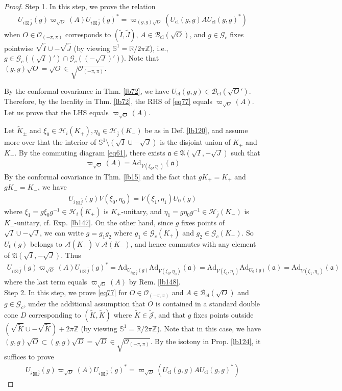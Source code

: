 \documentclass[11pt,b5paper,notitlepage]{article}
\theoremstyle{definition}
\theoremstyle{plain}
\newcommand{\fk}{\mathfrak}
\newcommand{\wtd}{\widetilde}
\newcommand{\ovl}{\overline}
\newcommand{\Jtd}{\widetilde{\mathcal J}}
\newcommand{\Ad}{\mathrm{Ad}}
\newcommand{\Zbb}{\mathbb Z}
\newcommand{\Rbb}{\mathbb R}
\newcommand{\Sbb}{{\mathbb S}}
\newcommand{\Gc}{\mathscr G_c}
\newcommand{\MA}{\mathcal A}
\newcommand{\MH}{\mathcal H}
\newcommand{\Bcl}{\mathcal B_{\mathrm{cl}}}
\newcommand{\Opp}{\mathcal O_{(-\pi,\pi)}}
\newcommand{\ZOpp}{\sqrt{\mathcal O_{(-\pi,\pi)}}}
\newcommand{\Ucl}{U_{\mathrm{cl}}}
\numberwithin{equation}{section}
\begin{document}
\begin{proof}
Step 1. In this step, we prove the relation
\begin{align*}
U_{i\boxtimes\ovl j}(g)\varpi_{\sqrt O}(A)U_{i\boxtimes\ovl j}(g)^*=\varpi_{(g,g)\sqrt O}(\Ucl(g,g)A\Ucl(g,g)^*)  \tag{a}\label{eq77}
\end{align*}
when $O\in\Opp$ corresponds to $(\wtd I,\wtd J)$, $A\in\Bcl(\sqrt O)$, and $g\in\Gc$ fixes pointwise $\sqrt {\wtd I}\cup -\sqrt {\wtd J}$ (by viewing $\Sbb^1=\Rbb/2\pi\Zbb$), i.e., $g\in\Gc((\sqrt I)')\cap\Gc((-\sqrt J)')$). Note that $(g,g)\sqrt O=\sqrt O\in\ZOpp$.


By the conformal covariance in Thm. \ref{lb72}, we have $\Ucl(g,g)\in\Bcl(\sqrt O')$. Therefore, by the locality in Thm. \ref{lb72}, the RHS of \eqref{eq77} equals $\varpi_{\sqrt O}(A)$. Let us prove that the LHS equals $\varpi_{\sqrt O}(A)$. 


Let $\wtd K_\pm$ and $\xi_0\in\MH_i(K_+),\eta_0\in\MH_{\ovl j}(K_-)$ be as in Def. \ref{lb120}, and assume more over that the interior of $\Sbb^1\setminus(\sqrt I\cup-\sqrt J)$ is the disjoint union of $K_+$ and $K_-$. By the commuting diagram \eqref{eq61}, there exists $\fk a\in \fk A(\sqrt I,-\sqrt J)$ such that
\begin{align*}
\varpi_{\sqrt O}(A)=\Ad_{V(\xi_0,\eta_0)}(\fk a)
\end{align*}
By the conformal covariance in Thm. \ref{lb15} and the fact that $gK_+=K_+$ and $gK_-=K_-$, we have
\begin{align*}
U_{i\boxtimes\ovl j}(g)V(\xi_0,\eta_0)=V(\xi_1,\eta_1)U_0(g)
\end{align*}
where $\xi_1=g\xi_0g^{-1}\in\MH_i(K_+)$ is $K_+$-unitary, and $\eta_1=g\eta_0g^{-1}\in\MH_{\ovl j}(K_-)$ is $K_-$-unitary, cf. Exp. \ref{lb147}. On the other hand, since $g$ fixes points of $\sqrt I\cup -\sqrt J$, we can write $g=g_1g_2$ where $g_1\in\Gc(K_+)$ and $g_2\in\Gc(K_-)$. So $U_0(g)$ belongs to $\MA(K_+)\vee\MA(K_-)$, and hence commutes with any element of $\fk A(\sqrt I,-\sqrt J)$. Thus
\begin{align*}
U_{i\boxtimes\ovl j}(g)\varpi_{\sqrt O}(A)U_{i\boxtimes\ovl j}(g)^*=\Ad_{U_{i\boxtimes\ovl j}(g)}\Ad_{V(\xi_0,\eta_0)}(\fk a)=\Ad_{V(\xi_1,\eta_1)}\Ad_{U_0(g)}(\fk a)=\Ad_{V(\xi_1,\eta_1)}(\fk a)
\end{align*}
where the last term equals $\varpi_{\sqrt O}(A)$ by Rem. \ref{lb148}.\\[-1ex]

Step 2. In this step, we prove \eqref{eq77} for $O\in\Opp$ and $A\in\Bcl(\sqrt O)$ and $g\in\Gc$, under the additional assumption that $O$ is contained in a standard double cone $D$ corresponding to $(\wtd K,\wtd K)$ where $\wtd K\in\Jtd$, and that $g$ fixes points outside $(\sqrt {\wtd K}\cup-\sqrt {\wtd K})+2\pi\Zbb$ (by viewing $\Sbb^1=\Rbb/2\pi\Zbb$). Note that in this case, we have $(g,g)\sqrt O\subset (g,g)\sqrt{D}=\sqrt{D}\in\ZOpp$. By the isotony in Prop. \ref{lb124}, it suffices to prove
\begin{align*}\label{eq78}
U_{i\boxtimes\ovl j}(g)\varpi_{\sqrt{D}}(A)U_{i\boxtimes\ovl j}(g)^*=\varpi_{\sqrt{D}}(\Ucl(g,g)A\Ucl(g,g)^*)  \tag{b}
\end{align*}



\end{proof}
\end{document}

